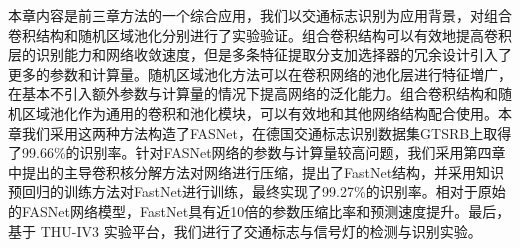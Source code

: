 本章内容是前三章方法的一个综合应用，我们以交通标志识别为应用背景，对组合卷积结构和随机区域池化分别进行了实验验证。组合卷积结构可以有效地提高卷积层的识别能力和网络收敛速度，但是多条特征提取分支加选择器的冗余设计引入了更多的参数和计算量。随机区域池化方法可以在卷积网络的池化层进行特征増广，在基本不引入额外参数与计算量的情况下提高网络的泛化能力。组合卷积结构和随机区域池化作为通用的卷积和池化模块，可以有效地和其他网络结构配合使用。本章我们采用这两种方法构造了FASNet，在德国交通标志识别数据集GTSRB上取得了99.66\%的识别率。针对FASNet网络的参数与计算量较高问题，我们采用第四章中提出的主导卷积核分解方法对网络进行压缩，提出了FastNet结构，并采用知识预回归的训练方法对FastNet进行训练，最终实现了99.27\%的识别率。相对于原始的FASNet网络模型，FastNet具有近10倍的参数压缩比率和预测速度提升。最后，基于 THU-IV3 实验平台，我们进行了交通标志与信号灯的检测与识别实验。










